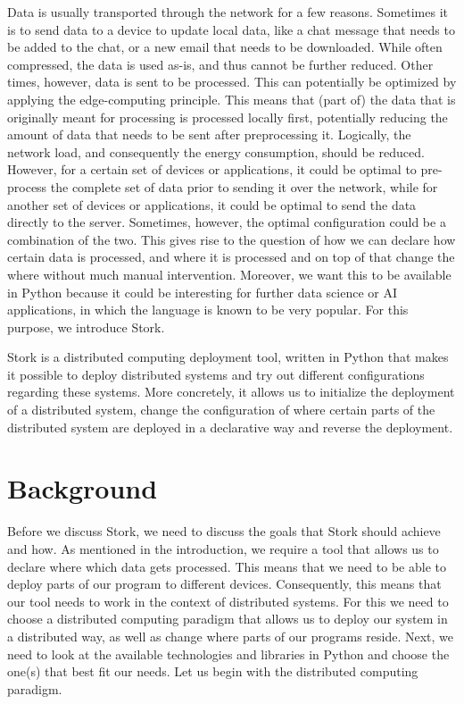 \documentclass[a4paper]{article}
\begin{document}
Data is usually transported through the network for a few reasons. Sometimes it is to send data to a device to update local data, like a chat message that needs to be added to the chat, or a new email that needs to be downloaded. While often compressed, the data is used as-is, and thus cannot be further reduced. Other times, however, data is sent to be processed. This can potentially be optimized by applying the edge-computing principle. This means that (part of) the data that is originally meant for processing is processed locally first, potentially reducing the amount of data that needs to be sent after preprocessing it. Logically, the network load, and consequently the energy consumption, should be reduced. However, for a certain set of devices or applications, it could be optimal to pre-process the complete set of data prior to sending it over the network, while for another set of devices or applications, it could be optimal to send the data directly to the server. Sometimes, however, the optimal configuration could be a combination of the two. This gives rise to the question of how we can declare how certain data is processed, and where it is processed and on top of that change the where without much manual intervention. Moreover, we want this to be available in Python because it could be interesting for further data science\cite{datasciencelanguage} or AI applications, in which the language is known to be very popular. For this purpose, we introduce Stork.

Stork is a distributed computing deployment tool, written in Python that makes it possible to deploy distributed systems and try out different configurations regarding these systems. More concretely, it allows us to initialize the deployment of a distributed system, change the configuration of where certain parts of the distributed system are deployed in a declarative way and reverse the deployment.
\section{Background}
Before we discuss Stork, we need to discuss the goals that Stork should achieve and how. As mentioned in the introduction, we require a tool that allows us to declare where which data gets processed. This means that we need to be able to deploy parts of our program to different devices. Consequently, this means that our tool needs to work in the context of distributed systems. For this we need to choose a distributed computing paradigm that allows us to deploy our system in a distributed way, as well as change where parts of our programs reside. Next, we need to look at the available technologies and libraries in Python and choose the one(s) that best fit our needs. Let us begin with the distributed computing paradigm.
\end{document}
